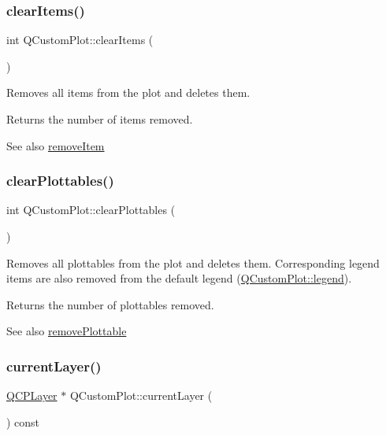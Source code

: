 \subsubsection{\texorpdfstring{clear\+Items()}{clearItems()}}
{\footnotesize\ttfamily int Q\+Custom\+Plot\+::clear\+Items (\begin{DoxyParamCaption}{ }\end{DoxyParamCaption})}

Removes all items from the plot and deletes them.

Returns the number of items removed.

\begin{DoxySeeAlso}{See also}
\hyperlink{classQCustomPlot_ae04446557292551e8fb6e2c106e1848d}{remove\+Item} 
\end{DoxySeeAlso}
\mbox{\label{classQCustomPlot_a9a409bb3201878adb7ffba1c89c4e004}} 
\subsubsection{\texorpdfstring{clear\+Plottables()}{clearPlottables()}}
{\footnotesize\ttfamily int Q\+Custom\+Plot\+::clear\+Plottables (\begin{DoxyParamCaption}{ }\end{DoxyParamCaption})}

Removes all plottables from the plot and deletes them. Corresponding legend items are also removed from the default legend (\hyperlink{classQCustomPlot_a4eadcd237dc6a09938b68b16877fa6af}{Q\+Custom\+Plot\+::legend}).

Returns the number of plottables removed.

\begin{DoxySeeAlso}{See also}
\hyperlink{classQCustomPlot_af3dafd56884208474f311d6226513ab2}{remove\+Plottable} 
\end{DoxySeeAlso}
\mbox{\label{classQCustomPlot_a0421d647f420b0b4c57aec1708857af5}} 
\subsubsection{\texorpdfstring{current\+Layer()}{currentLayer()}}
{\footnotesize\ttfamily \hyperlink{classQCPLayer}{Q\+C\+P\+Layer} $\ast$ Q\+Custom\+Plot\+::current\+Layer (\begin{DoxyParamCaption}{ }\end{DoxyParamCaption}) const}

